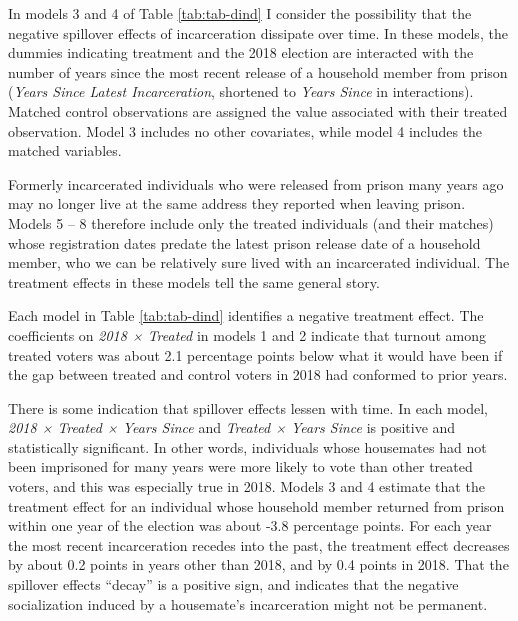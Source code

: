 \documentclass[
  12pt,
]{article}
\begin{document}
In models 3 and 4 of Table \ref{tab:tab-dind} I consider the possibility that the negative spillover effects of incarceration dissipate over time. In these models, the dummies indicating treatment and the 2018 election are interacted with the number of years since the most recent release of a household member from prison (\emph{Years Since Latest Incarceration}, shortened to \emph{Years Since} in interactions). Matched control observations are assigned the value associated with their treated observation. Model 3 includes no other covariates, while model 4 includes the matched variables.

Formerly incarcerated individuals who were released from prison many years ago may no longer live at the same address they reported when leaving prison. Models 5 -- 8 therefore include only the treated individuals (and their matches) whose registration dates predate the latest prison release date of a household member, who we can be relatively sure lived with an incarcerated individual. The treatment effects in these models tell the same general story.

\begin{singlespace}

\end{singlespace}

Each model in Table \ref{tab:tab-dind} identifies a negative treatment effect. The coefficients on \emph{2018 × Treated} in models 1 and 2 indicate that turnout among treated voters was about 2.1 percentage points below what it would have been if the gap between treated and control voters in 2018 had conformed to prior years.

There is some indication that spillover effects lessen with time. In each model, \emph{2018 × Treated × Years Since} and \emph{Treated × Years Since} is positive and statistically significant. In other words, individuals whose housemates had not been imprisoned for many years were more likely to vote than other treated voters, and this was especially true in 2018. Models 3 and 4 estimate that the treatment effect for an individual whose household member returned from prison within one year of the election was about -3.8 percentage points. For each year the most recent incarceration recedes into the past, the treatment effect decreases by about 0.2 points in years other than 2018, and by 0.4 points in 2018. That the spillover effects ``decay'' is a positive sign, and indicates that the negative socialization induced by a housemate's incarceration might not be permanent.
\end{document}
